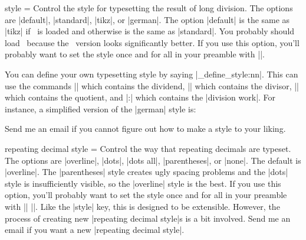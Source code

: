 \documentclass{ltxdoc}
\begin{document}
\begin{key}{style = }
Control the style for typesetting the result of long division. The options are |default|, |standard|, |tikz|, or |german|. The option |default| is the same as |tikz| if \tikzname\ is loaded and otherwise is the same as |standard|. You probably should load \tikzname\ because the \tikzname\ version looks significantly better. If you use this option, you'll probably want to set the style once and for all in your preamble with ||.
\begin{tcblisting}{}
 \quad
{} \quad
{}
\end{tcblisting}
You can define your own typesetting style by saying |\longdiv_define_style:nn|. This can use the commands |\longdivdividend| which contains the dividend, |\longdivdivisor| which contains the divisor, |\longdivquotient| which contains the quotient, and |\longdivwork:| which contains the |division work|.  For instance, a simplified version of the |german| style is:
\begin{tcblisting}{}
\end{tcblisting}
Send me an email if you cannot figure out how to make a style to your liking.
\end{key}

\begin{key}{repeating decimal style = }
Control the way that repeating decimals are typeset. The options are |overline|, |dots|, |dots all|, |parentheses|, or |none|. The default is |overline|. The |parentheses| style creates ugly spacing problems and the |dots| style is insufficiently visible, so the |overline| style is the best. If you use this option, you'll probably want to set the style once and for all in your preamble with || ||. Like the |style| key, this is designed to be extensible. However, the process of creating new |repeating decimal style|s is a bit involved. Send me an email if you want a new |repeating decimal style|.
\begin{tcblisting}{}
 \quad
{} \quad
{} \quad
{} \quad
{}
\end{tcblisting}
\end{key}
\end{document}
